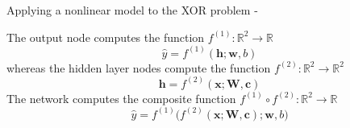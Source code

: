 \begin{frame}[t,allowframebreaks]{Applying a nonlinear model to the XOR problem -}
\begin{center}
    \end{center}        

    \framebreak

    The output node computes the function 
    $f^{(1)}: \mathbb{R}^2 \rightarrow \mathbb{R}$
    \begin{equation}
        \hat{y} = 
        f^{(1)}(\mathbf{h};\mathbf{w},b)
        \label{eq:learn_xor_nonlinear_model_f1}
    \end{equation}        
    whereas the hidden layer nodes
    compute the function
    $f^{(2)}: \mathbb{R}^2 \rightarrow \mathbb{R}^2$
    \begin{equation}
        \mathbf{h} = 
        f^{(2)}(\mathbf{x};\mathbf{W},\mathbf{c})
        \label{eq:learn_xor_nonlinear_model_f2}
    \end{equation}        
    The network computes the composite function 
    $f^{(1)} \circ f^{(2)}: \mathbb{R}^2 \rightarrow \mathbb{R}$
    \begin{equation}
        \hat{y} = 
        f^{(1)}\Big(f^{(2)}(\mathbf{x};\mathbf{W},\mathbf{c});\mathbf{w},b\Big)
        \label{eq:learn_xor_nonlinear_model_f1f2}
    \end{equation}        
      

\end{frame}
